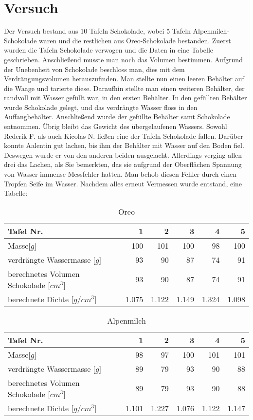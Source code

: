 \documentclass[12pt]{scrartcl}
\begin{document}
\section{Versuch}
Der Versuch bestand aus 10 Tafeln Schokolade, wobei 5 Tafeln Alpenmilch-Schokolade waren und die restlichen aus Oreo-Schokolade bestanden. Zuerst wurden die Tafeln Schokolade verwogen und die Daten in eine Tabelle geschrieben. Anschließend musste man noch das Volumen bestimmen. Aufgrund der Unebenheit von Schokolade beschloss man, dies mit dem Verdrängungsvolumen herauszufinden. Man stellte nun einen leeren Behälter auf die Waage und tarierte diese. Daraufhin stellte man einen weiteren Behälter, der randvoll mit Wasser gefüllt war, in den ersten Behälter. In den gefüllten Behälter wurde Schokolade gelegt, und das verdrängte Wasser floss in den Auffangbehälter. Anschließend wurde der gefüllte Behälter samt Schokolade entnommen. Übrig bleibt das Gewicht des übergelaufenen Wassers. Sowohl Rederik F. als auch Kicolas N. ließen eine der Tafeln Schokolade fallen. Darüber konnte Aalentin gut lachen, bis ihm der Behälter mit Wasser auf den Boden fiel. Deswegen wurde er von den anderen beiden ausgelacht. Allerdings verging allen drei das Lachen, als Sie bemerkten, das sie aufgrund der Oberflächen Spannung von Wasser immense Messfehler hatten. Man behob diesen Fehler durch einen Tropfen Seife im Wasser. Nachdem alles erneut Vermessen wurde entstand, eine Tabelle:
	\begin{table}[h!]
	  \caption{Oreo}
      \label{tab:oreo}	  
      \begin{tabular}{l|r|r|r|r|r}
      \toprule
      Tafel Nr. & 1 & 2 & 3 & 4 & 5\\
      \midrule
      Masse[$g$] & 100 & 101 & 100 & 98 & 100\\
      \midrule
      verdrängte Wassermasse [$g$] & 93 & 90 & 87 & 74 & 91\\
      \midrule
      berechnetes Volumen Schokolade [$cm^3$] & 93 & 90 & 87 & 74 & 91\\
      \midrule
      berechnete Dichte [$g/cm^3$] & 1.075 & 1.122 & 1.149 & 1.324 & 1.098 \\
      \bottomrule
      \end{tabular}
	\end{table}
\begin{table}[h!]
	  \caption{Alpenmilch}
      \label{tab:alpenmilch}	  
      \begin{tabular}{l|r|r|r|r|r}
      \toprule
      Tafel Nr. & 1 & 2 & 3 & 4 & 5\\
	  \midrule
      Masse[$g$] & 98 & 97 & 100 & 101 & 101\\
      \midrule
      verdrängte Wassermasse [$g$] & 89 & 79 & 93 & 90 & 88\\
      \midrule
      berechnetes Volumen Schokolade [$cm^3$] & 89 & 79 & 93 & 90 & 88\\
      \midrule
      berechnete Dichte [$g/cm^3$] & 1.101 & 1.227 & 1.076 & 1.122 & 1.147 \\
      \bottomrule
      \end{tabular}
	\end{table}
\end{document}
